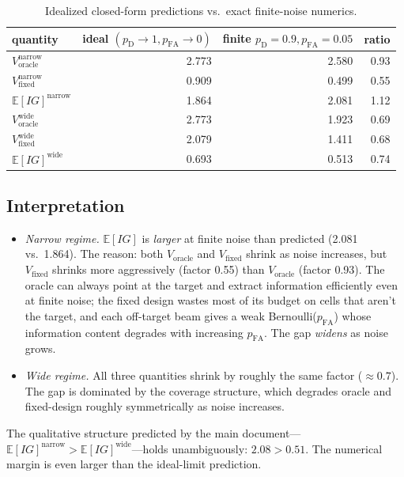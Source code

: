 \documentclass[11pt,a4paper]{article}
\newcommand{\E}{\mathbb{E}}
\begin{document}
\begin{table}[h!]
\centering
\begin{tabular}{@{}lrrr@{}}
\toprule
quantity & ideal $(p_{\mathrm{D}}\!\to\!1, p_{\mathrm{FA}}\!\to\!0)$ & finite $p_{\mathrm{D}}\!=\!0.9, p_{\mathrm{FA}}\!=\!0.05$ & ratio \\
\midrule
$V_{\text{oracle}}^{\text{narrow}}$ & 2.773 & 2.580 & 0.93 \\
$V_{\text{fixed}}^{\text{narrow}}$  & 0.909 & 0.499 & 0.55 \\
$\E[IG]^{\text{narrow}}$            & 1.864 & 2.081 & 1.12 \\
\midrule
$V_{\text{oracle}}^{\text{wide}}$   & 2.773 & 1.923 & 0.69 \\
$V_{\text{fixed}}^{\text{wide}}$    & 2.079 & 1.411 & 0.68 \\
$\E[IG]^{\text{wide}}$              & 0.693 & 0.513 & 0.74 \\
\bottomrule
\end{tabular}
\caption{Idealized closed-form predictions vs.\ exact finite-noise numerics.}
\label{tab:ideal_vs_num}
\end{table}

\subsection{Interpretation}
\begin{itemize}
  \item \emph{Narrow regime.}  $\E[IG]$ is \emph{larger} at finite noise than predicted (2.081 vs.\ 1.864).  The reason: both $V_{\text{oracle}}$ and $V_{\text{fixed}}$ shrink as noise increases, but $V_{\text{fixed}}$ shrinks more aggressively (factor 0.55) than $V_{\text{oracle}}$ (factor 0.93).  The oracle can always point at the target and extract information efficiently even at finite noise; the fixed design wastes most of its budget on cells that aren't the target, and each off-target beam gives a weak Bernoulli($p_{\mathrm{FA}}$) whose information content degrades with increasing $p_{\mathrm{FA}}$.  The gap \emph{widens} as noise grows.
  \item \emph{Wide regime.}  All three quantities shrink by roughly the same factor ($\approx 0.7$).  The gap is dominated by the coverage structure, which degrades oracle and fixed-design roughly symmetrically as noise increases.
\end{itemize}
The qualitative structure predicted by the main document---$\E[IG]^{\text{narrow}} > \E[IG]^{\text{wide}}$---holds unambiguously: $2.08 > 0.51$.  The numerical margin is even larger than the ideal-limit prediction.
\end{document}
